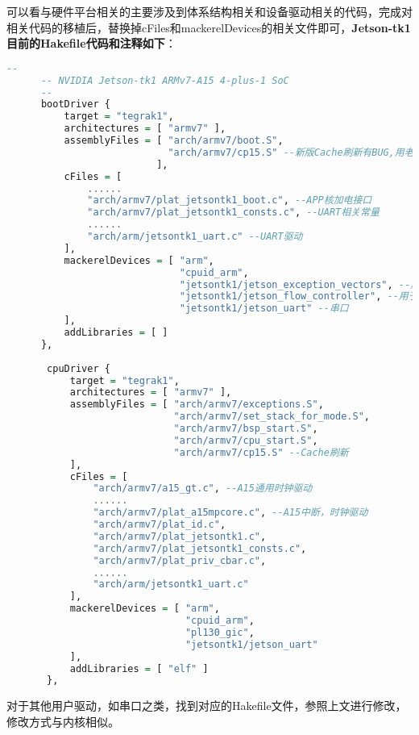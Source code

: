 \documentclass[a4paper, 12pt]{report}
\begin{document}
    可以看与硬件平台相关的主要涉及到体系结构相关和设备驱动相关的代码，完成对相关代码的移植后，替换掉cFiles和mackerelDevices的相关文件即可，\textbf{Jetson-tk1目前的Hakefile代码和注释如下}：
    
    \begin{lstlisting}[language = Haskell]
      --
      -- NVIDIA Jetson-tk1 ARMv7-A15 4-plus-1 SoC
      --
      bootDriver {
          target = "tegrak1",
          architectures = [ "armv7" ],
          assemblyFiles = [ "arch/armv7/boot.S",
                            "arch/armv7/cp15.S" --新版Cache刷新有BUG,用老版代替
                          ],
          cFiles = [
              ......
              "arch/armv7/plat_jetsontk1_boot.c", --APP核加电接口
              "arch/armv7/plat_jetsontk1_consts.c", --UART相关常量
              ......
              "arch/arm/jetsontk1_uart.c" --UART驱动
          ],
          mackerelDevices = [ "arm",
                              "cpuid_arm",
                              "jetsontk1/jetson_exception_vectors", --用于启动APP核
                              "jetsontk1/jetson_flow_controller", --用于启动APP核
                              "jetsontk1/jetson_uart" --串口
          ],
          addLibraries = [ ]
      },
      
       cpuDriver {
           target = "tegrak1",
           architectures = [ "armv7" ],
           assemblyFiles = [ "arch/armv7/exceptions.S",
                             "arch/armv7/set_stack_for_mode.S",
                             "arch/armv7/bsp_start.S",
                             "arch/armv7/cpu_start.S",
                             "arch/armv7/cp15.S" --Cache刷新
           ],
           cFiles = [
               "arch/armv7/a15_gt.c", --A15通用时钟驱动
               ......
               "arch/armv7/plat_a15mpcore.c", --A15中断，时钟驱动
               "arch/armv7/plat_id.c",
               "arch/armv7/plat_jetsontk1.c",
               "arch/armv7/plat_jetsontk1_consts.c",
               "arch/armv7/plat_priv_cbar.c",
               ......
               "arch/arm/jetsontk1_uart.c"
           ],
           mackerelDevices = [ "arm",
                               "cpuid_arm",
                               "pl130_gic",
                               "jetsontk1/jetson_uart"
           ],
           addLibraries = [ "elf" ]
       },
    \end{lstlisting}
    
    对于其他用户驱动，如串口之类，找到对应的Hakefile文件，参照上文进行修改，修改方式与内核相似。
    
\end{document}
